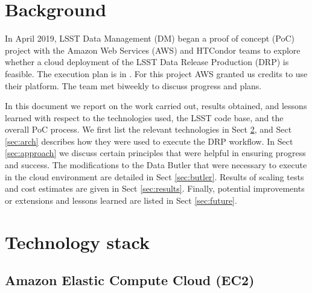 \newcommand{\poc}{AWS PoC}





\section{Background}

In April 2019, LSST Data Management (DM) began a proof of concept (PoC) project with the Amazon Web Services (AWS) and HTCondor teams to explore whether a cloud deployment of the LSST Data Release Production (DRP) is feasible.
The execution plan is in .
For this project AWS granted us credits to use their platform.
The team met biweekly to discuss progress and plans.

In this document we report on the work carried out, results obtained, and lessons learned with respect to the technologies used, the LSST code base, and the overall PoC process.
We first list the relevant technologies in Sect \ref{sec:tech}, and Sect \ref{sec:arch} describes how they were used to execute the DRP workflow.
In Sect \ref{sec:approach} we discuss certain principles that were helpful in ensuring progress and success.
The modifications to the Data Butler that were necessary to execute in the cloud environment are detailed in Sect \ref{sec:butler}.
Results of scaling tests and cost estimates are given in Sect \ref{sec:results}.
Finally, potential improvements or extensions and lessons learned are listed in Sect \ref{sec:future}.

\section{Technology stack} \label{sec:tech}

\subsection{Amazon Elastic Compute Cloud (EC2)}

